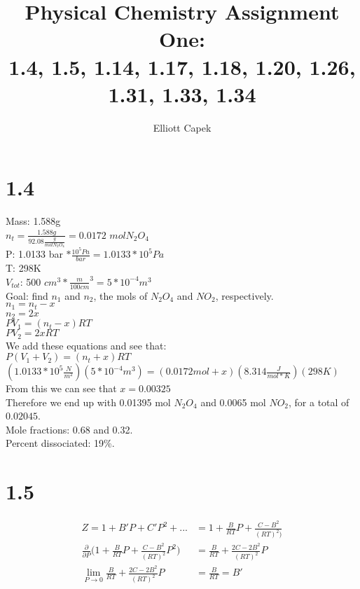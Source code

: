 \documentclass[10pt]{article} %
\title{Physical Chemistry Assignment One:\\1.4, 1.5, 1.14, 1.17, 1.18, 1.20, 1.26, 1.31, 1.33, 1.34}
\author{Elliott Capek}
\begin{document}
\maketitle{}

\section{1.4}
Mass: 1.588g\\
$n_t = \frac{1.588g}{92.08 \frac{g}{mol N_2O_4}} = 0.0172$ $ mol N_2O_4$\\
P: 1.0133 bar $* \frac{10^5 Pa}{bar} = 1.0133*10^5Pa$\\
T: 298K\\
$V_{tot}$: 500 $cm^3 * \frac{m}{100 cm}^3 = 5*10^{-4}m^3$\\

Goal: find $n_1$ and $n_2$, the mols of $N_2O_4$ and $NO_2$, respectively.\\

$n_1 = n_t-x$\\
$n_2 = 2x$\\

$PV_1 = (n_t-x)RT$\\
$PV_2 = 2xRT$\\

We add these equations and see that:\\

$P(V_1 + V_2) = (n_t+x)RT$\\
$(1.0133*10^5 \frac{N}{m^2})(5*10^{-4}m^3) = (0.0172 mol + x)(8.314 \frac{J}{mol*K})(298K)$\\

From this we can see that $x = 0.00325$\\

Therefore we end up with 0.01395 mol $N_2O_4$ and 0.0065 mol $NO_2$, for a total of $0.02045$.\\

Mole fractions: 0.68 and 0.32.\\

Percent dissociated: 19\%.

\section{1.5}
\begin{align}
  Z = 1 + B'P + C'P^2 + ... &= 1 + \frac{B}{RT}P + \frac{C-B^2}{(RT)^2)}\\
  \frac{\partial }{\partial P} \Big(1 + \frac{B}{RT}P + \frac{C-B^2}{(RT)^2}P^2 \Big) &= \frac{B}{RT} + \frac{2C-2B^2}{(RT)^2}P\\
  \lim_{P\to0} \frac{B}{RT} + \frac{2C-2B^2}{(RT)^2}P &= \frac{B}{RT} = B'\\
\end{align}
\end{document}

